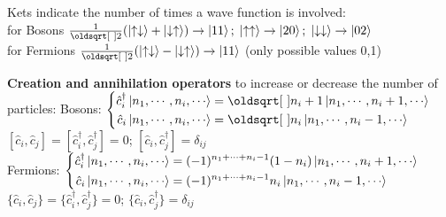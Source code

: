 \begin{squishlist}
    \item Kets indicate the number of times a wave function is involved:\\
    for Bosons $\frac{1}{\sqrt{2}} ( \ket{\uparrow \downarrow} + \ket{\downarrow \uparrow}) \rightarrow \ket{11};\; \ket{\uparrow \uparrow} \rightarrow \ket{20};\; \ket{\downarrow \downarrow} \rightarrow \ket{02}$\\
    for Fermions $\frac{1}{\sqrt{2}} ( \ket{\uparrow \downarrow} - \ket{\downarrow \uparrow}) \rightarrow \ket{11}$ (only possible values 0,1)
    \item \textbf{Creation and annihilation operators} to increase or decrease the number of particles:
    Bosons:  $\left\{ \begin{aligned}
    \hat{c}_i^{\dagger} \ket{n_1, \cdots, n_i, \cdots} &= \sqrt{n_i + 1} \ket{n_1, \cdots, n_i +1, \cdots} \\
    \hat{c}_i \ket{n_1, \cdots, n_i, \cdots} &= \sqrt{n_i} \ket{n_1, \cdots, n_i -1, \cdots}
    \end{aligned}\right.$ \\
    $[\hat{c}_i, \hat{c}_j] = [\hat{c}_i^{\dagger}, \hat{c}_j^{\dagger}] = 0$; \qquad $[\hat{c}_i, \hat{c}_j^{\dagger}] = \delta_{ij}$ \\
    Fermions: $\left\{ \begin{aligned}
    \hat{c}_i^{\dagger} \ket{n_1, \cdots, n_i, \cdots} &= (-1)^{n_1+\cdots+n_i-1}(1-n_i) \ket{n_1, \cdots, n_i +1, \cdots} \\
    \hat{c}_i \ket{n_1, \cdots, n_i, \cdots} &= (-1)^{n_1+\cdots+n_i-1} n_i \ket{n_1, \cdots, n_i -1, \cdots}
    \end{aligned}\right.$ \\
    $\{\hat{c}_i, \hat{c}_j\} = \{\hat{c}_i^{\dagger}, \hat{c}_j^{\dagger}\} = 0$; \qquad $\{\hat{c}_i, \hat{c}_j^{\dagger}\} = \delta_{ij}$ 
\end{squishlist}

\columnbreak


